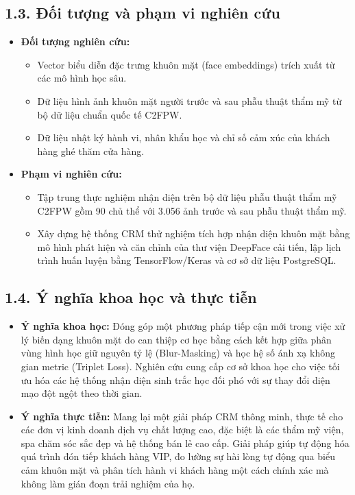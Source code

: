 \subsection*{1.3. Đối tượng và phạm vi nghiên cứu}

\begin{itemize}
    \item \textbf{Đối tượng nghiên cứu:}
    \begin{itemize}
        \item Vector biểu diễn đặc trưng khuôn mặt (face embeddings) trích xuất từ các mô hình học sâu.
        \item Dữ liệu hình ảnh khuôn mặt người trước và sau phẫu thuật thẩm mỹ từ bộ dữ liệu chuẩn quốc tế C2FPW.
        \item Dữ liệu nhật ký hành vi, nhân khẩu học và chỉ số cảm xúc của khách hàng ghé thăm cửa hàng.
    \end{itemize}
    \item \textbf{Phạm vi nghiên cứu:}
    \begin{itemize}
        \item Tập trung thực nghiệm nhận diện trên bộ dữ liệu phẫu thuật thẩm mỹ C2FPW gồm 90 chủ thể với 3.056 ảnh trước và sau phẫu thuật thẩm mỹ.
        \item Xây dựng hệ thống CRM thử nghiệm tích hợp nhận diện khuôn mặt bằng mô hình phát hiện và căn chỉnh của thư viện DeepFace cải tiến, lập lịch trình huấn luyện bằng TensorFlow/Keras và cơ sở dữ liệu PostgreSQL.
    \end{itemize}
\end{itemize}

\subsection*{1.4. Ý nghĩa khoa học và thực tiễn}

\begin{itemize}
    \item \textbf{Ý nghĩa khoa học:} 
    Đóng góp một phương pháp tiếp cận mới trong việc xử lý biến dạng khuôn mặt do can thiệp cơ học bằng cách kết hợp giữa phân vùng hình học giữ nguyên tỷ lệ (Blur-Masking) và học hệ số ánh xạ không gian metric (Triplet Loss). Nghiên cứu cung cấp cơ sở khoa học cho việc tối ưu hóa các hệ thống nhận diện sinh trắc học đối phó với sự thay đổi diện mạo đột ngột theo thời gian.
    
    \item \textbf{Ý nghĩa thực tiễn:} 
    Mang lại một giải pháp CRM thông minh, thực tế cho các đơn vị kinh doanh dịch vụ chất lượng cao, đặc biệt là các thẩm mỹ viện, spa chăm sóc sắc đẹp và hệ thống bán lẻ cao cấp. Giải pháp giúp tự động hóa quá trình đón tiếp khách hàng VIP, đo lường sự hài lòng tự động qua biểu cảm khuôn mặt và phân tích hành vi khách hàng một cách chính xác mà không làm gián đoạn trải nghiệm của họ.
\end{itemize}
